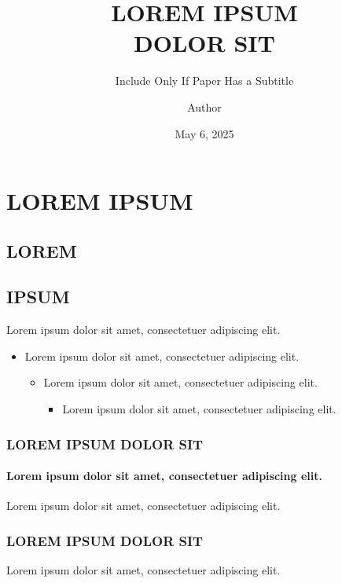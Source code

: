 \documentclass[11pt, aspectratio=169]{beamer}
\title[]{LOREM IPSUM \\ DOLOR SIT}
\author{Author}
\date{May 6, 2025}
\subtitle{Include Only If Paper Has a Subtitle}
\begin{document}
\begin{frame}
	\maketitle
\end{frame}

\begin{frame}
\end{frame}


\section{LOREM IPSUM}
\subsection{LOREM}
\subsection{IPSUM}

\begin{frame}[t]{\secname}{Lorem ipsum dolor sit amet, consectetuer adipiscing elit.}
	\begin{itemize}
		\item Lorem ipsum dolor sit amet, consectetuer adipiscing elit.
         \begin{itemize}
             \item Lorem ipsum dolor sit amet, consectetuer adipiscing elit.
             \begin{itemize}
                \item Lorem ipsum dolor sit amet, consectetuer adipiscing elit.
             \end{itemize}
         \end{itemize}
	\end{itemize}
\end{frame}

\begin{frame}[t]
    \frametitle{LOREM IPSUM DOLOR SIT}
    \framesubtitle{Lorem ipsum dolor sit amet, consectetuer adipiscing elit.}
    Lorem ipsum dolor sit amet, consectetuer adipiscing elit.
\end{frame}

\begin{frame}
    \frametitle{LOREM IPSUM DOLOR SIT}
    Lorem ipsum dolor sit amet, consectetuer adipiscing elit.
\end{frame}
\end{document}
